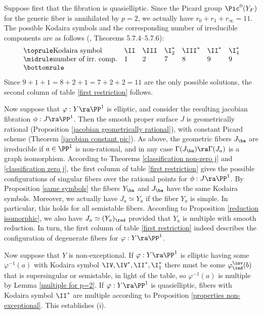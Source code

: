 Suppose first that the fibration is quasielliptic.  Since the Picard group $\Pic^0(Y_F)$ for the generic fiber
is annihilated by $p=2$, we actually have  $r_0+r_1+r_\infty=11$. The possible Kodaira symbols
and
the corresponding number of irreducible components  are as follows (\cite{Cossec-Dolgachev-1989}, Theorems 5.7.4--5.7.6):
$$
\begin{array}{lllllll}
\toprule
\text{Kodaira symbol}			& \II	& \III	& \I_2^*	& \III^*	& \II^*	& \I_4^*\\
\midrule
\text{number of irr.\ comp.}	& 1		& 2		& 7			& 8			& 9		& 9\\
\bottomrule
\end{array}
$$
Since $9+1+1=8+2+1=7+2+2=11$ are the only possible solutions, the second column of table \eqref{first restriction} follows.

Now suppose that $\varphi:Y\ra\PP^1$ is elliptic, and consider the resulting jacobian fibration $\phi:J\ra\PP^1$.
Then the smooth proper surface $J$ is geometrically rational (Proposition \ref{jacobian geometrically rational}),
with constant Picard scheme (Theorem \ref{jacobian constant pic}).
As above, the geometric fibers $J_\ba$ are irreducible if $a\in \PP^1$ is non-rational,
and in any case $\Gamma(J_\ba)\ra\Gamma(J_a)$ is a graph isomorphism.
According to Theorems \ref{classification non-zero j} and \ref{classification zero j},
the first column of table \eqref{first restriction} gives the possible configurations
of singular fibers over the  rational points for $\phi:J\ra\PP^1$.
By Proposition \ref{same symbols} the fibers $Y_\ba$ and $J_\ba$ have the same Kodaira symbols.
Moreover, we  actually have $J_a\simeq Y_a$ if the fiber $Y_a$ is simple. In particular, this holds for all semistable
fibers. According to Proposition \ref{reduction isomorphic}, we also have $J_a\simeq (Y_a)_\red$ provided that $Y_a$ is multiple
with smooth reduction. In turn, the first column of table \eqref{first restriction} indeed describes the configuration of
degenerate fibers for $\varphi:Y\ra\PP^1$.

Now suppose that $Y$ is non-exceptional. If $\varphi:Y\ra\PP^1$ is elliptic
having some $\varphi^{-1}(a)$ with Kodaira symbol $\IV,\IV^*,\II^*,\I_1^*$ there must   be
some $\varphi^\inv_\ind(b)$ that is supersingular or semistable, in light of  the table,
so $\varphi^{-1}(a)$ is multiple by Lemma \ref{multiple for p=2}.
If $\varphi:Y\ra\PP^1$ is quasielliptic, fibers with Kodaira symbol $\II^*$ are multiple
according to    Proposition \ref{properties non-exceptional}. This establishes (i).

